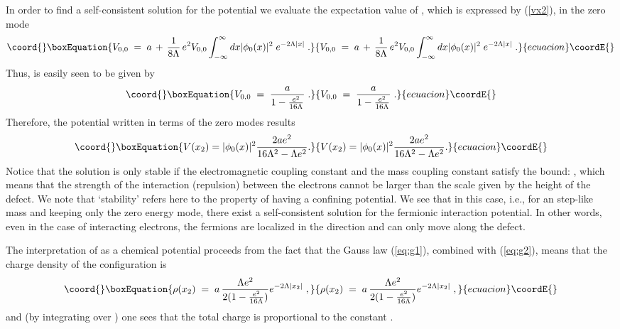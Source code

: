 \documentclass[a4paper,12pt]{article}
\begin{document}
{{\begin{itemize}
In order to find a self-consistent solution for the potential we
evaluate the expectation value of \coordHE{}, which is expressed by
(\ref{vx2}), in the zero mode
\begin{equation}\coord{}\boxEquation{
V_{0,0}\;=\;a\,+\, \frac{1}{8 \Lambda}\, e^2 V_{0,0}\int_{-\infty}^{\infty} dx
|\phi_0(x)|^2 \;e^{-2\Lambda|x|}\;.
}{
V_{0,0}\;=\;a\,+\, \frac{1}{8 \Lambda}\, e^2 V_{0,0}\int_{-\infty}^{\infty} dx
|\phi_0(x)|^2 \;e^{-2\Lambda|x|}\;.
}{ecuacion}\coordE{}\end{equation}
Thus, \coordHE{} is easily seen to be given by
\begin{equation}\coord{}\boxEquation{
   \label{eq:g2}
V_{0,0}\;=\;\frac{a}{1-\frac{e^2}{16\Lambda}}\;.
}{
   V_{0,0}\;=\;\frac{a}{1-\frac{e^2}{16\Lambda}}\;.
}{ecuacion}\coordE{}\end{equation}
Therefore, the potential written in terms of the zero modes results
\begin{equation}\coord{}\boxEquation{
V({x_2})=|\phi_0(x)|^2{\frac{2ae^2}{16\Lambda^2-\Lambda e^2}}.
}{
V({x_2})=|\phi_0(x)|^2{\frac{2ae^2}{16\Lambda^2-\Lambda e^2}}.
}{ecuacion}\coordE{}\end{equation}
Notice that the solution is only stable if the electromagnetic
coupling constant and the mass coupling constant satisfy the bound:
\coordHE{}, which means that the strength of the interaction
(repulsion) between the electrons cannot be larger than the scale
given by the height of the defect. We note that `stability' refers
here to the property of having a confining potential.  We see that in
this case, i.e., for an step-like mass and keeping only the zero
energy mode, there exist a self-consistent solution for the fermionic
interaction potential. In other words, even in the case of interacting
electrons, the fermions are localized in the \coordHE{} direction and can
only move along the defect.

The interpretation of \coordHE{} as a chemical potential proceeds from the
fact that the Gauss law (\ref{eq:g1}), combined with (\ref{eq:g2}),
means that the charge density of the configuration is
\begin{equation}\coord{}\boxEquation{
\rho (x_2)\;=\;  a \, \frac{\Lambda e^2}{2(1-\frac{e^2}{16\Lambda})}
e^{-2 \Lambda |x_2|}\;,
}{
\rho (x_2)\;=\;  a \, \frac{\Lambda e^2}{2(1-\frac{e^2}{16\Lambda})}
e^{-2 \Lambda |x_2|}\;,
}{ecuacion}\coordE{}\end{equation}
and (by integrating over \coordHE{}) one sees that the total charge is
proportional to the constant \coordHE{}.


\end{itemize}}}
\end{document}
